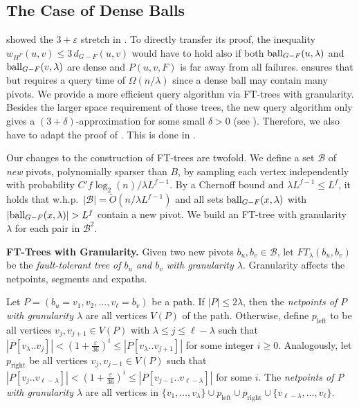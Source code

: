 \documentclass{theoretics}
\newcommand*{\B}{\mathcal{B}}
\newcommand*{\Otilde}{\widetilde{O}}
\newcommand*{\length}[1]{|#1|}
\newcommand*{\ball}{\mbox{\rm ball}}
\renewcommand{\leq}{\leqslant}
\renewcommand{\le}{\leqslant}
\renewcommand{\ge}{\geqslant}
\newcommand{\eps}{\varepsilon}
\begin{document}
\subsection{The Case of Dense Balls}
\label{subsec:improved_query_dense}

 showed the $3+\varepsilon$ stretch in .
To directly transfer its proof, the inequality $w_{H^F}(u,v) \le 3 \, d_{G-F}(u,v)$ would have to hold
also if both $\ball_{G-F}(u,\lambda)$ and $\ball_{G-F}(v,\lambda)$ are dense
and $P(u,v,F)$ is far away from all failures.
 ensures that but requires a query time of $\Omega(n/\lambda)$
since a dense ball may contain many pivots. 
We provide a more efficient query algorithm via FT-trees with granularity.
Besides the larger space requirement of those trees,
the new query algorithm only gives a $(3{+}\delta)$-approximation for some small $\delta > 0$ (see ).
Therefore, we also have to adapt the proof of .
This is done in .

Our changes to the construction of FT-trees are twofold.
We define a set $\B$  of \emph{new} pivots,
polynomially sparser than $B$, by sampling each vertex independently with probability 
$C' f\log_2(n)/\lambda L^{f-1}$.
By a Chernoff bound and $\lambda L^{f-1} \le L^f$, 
it holds that w.h.p.\ $|\B| = \Otilde(n/\lambda L^{f-1})$ and
all sets $\ball_{G-F}(x,\lambda)$ with $|\ball_{G-F}(x,\lambda)| > L^f$
contain a new pivot.
We build an FT-tree with granularity $\lambda$ for each pair in $\B^2$.
\vspace*{.5em}

\noindent
\textbf{FT-Trees with Granularity.}
Given two new pivots $b_u,b_v \in \B$, let $FT_\lambda(b_u,b_v)$ be the \emph{fault-tolerant tree of $b_u$ and $b_v$ with granularity $\lambda$}. 
Granularity affects the netpoints, segments and expaths.

\begin{definition}
\label{def:dense_netpoint}
  Let $P = (b_u = v_1, v_2, \ldots, v_\ell= b_v)$ be a path.
  If $|P| \leq 2\lambda$, then the \emph{netpoints of $P$ with granularity $\lambda$}
  are all vertices $V(P)$ of the path.
  Otherwise, define $p_{\text{left}}$ to be all vertices $v_j,v_{j+1} \in V(P)$ 
  with $\lambda \le j \le \ell-\lambda$ 
  such that $\length{P[v_\lambda..v_j]} < (1{+}\frac{\eps}{36})^i \le \length{P[v_\lambda..v_{j+1}]}$
  for some integer $i \ge 0$.
  Analogously, let $p_{\text{right}}$ be all vertices $v_j,v_{j-1} \in V(P)$ 
  such that $\length{P[v_j..v_{\ell-\lambda}]} < (1{+}\frac{\eps}{36})^i \le \length{P[v_{j-1}..v_{\ell-\lambda}]}$
  for some $i$.
  The \emph{netpoints of P with granularity $\lambda$} are all vertices in
  $\{v_1,\ldots,v_{\lambda}\} \cup p_{\text{left}} \cup p_{\text{right}} 
  	\cup \{v_{\ell-\lambda},\ldots, v_\ell\}$.
\end{definition}
\end{document}

